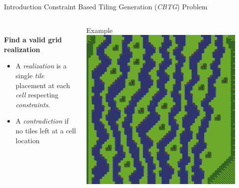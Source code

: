 \documentclass{beamer}
\begin{document}
  \begin{frame}[fragile]{Introduction}
    Constraint Based Tiling Generation (\textit{CBTG}) Problem
    \begin{columns}[T,onlytextwidth]
        \begin{block}{}
          \hfill \\
          \textbf{Find a valid grid realization}

          \begin{itemize}
            \item A \textit{realization} is a single \textit{tile} placement at each \textit{cell} respecting \textit{constraints}.
            \item A \textit{contradiction} if no tiles left at a cell location
          \end{itemize}
        \end{block}
        \begin{block}{Example}
          \includegraphics[width=0.9\textwidth]{img/forestmicro_64x64.pdf}
        \end{block}
    \end{columns}
  \end{frame}
\end{document}
